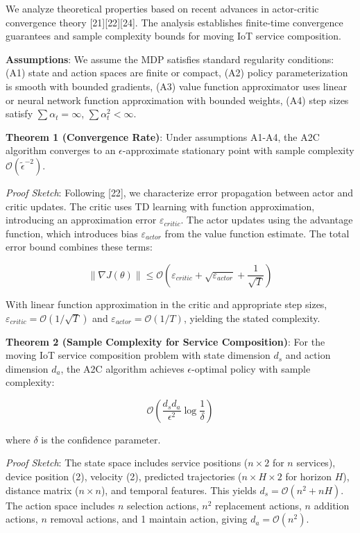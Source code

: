 \documentclass[
  10pt,
  twocolumn,
]{article}
\begin{document}
We analyze theoretical properties based on recent advances in
actor-critic convergence theory {[}21{]}{[}22{]}{[}24{]}. The analysis
establishes finite-time convergence guarantees and sample complexity
bounds for moving IoT service composition.

\textbf{Assumptions}: We assume the MDP satisfies standard regularity
conditions: (A1) state and action spaces are finite or compact, (A2)
policy parameterization is smooth with bounded gradients, (A3) value
function approximator uses linear or neural network function
approximation with bounded weights, (A4) step sizes satisfy
\(\sum \alpha_t = \infty\), \(\sum \alpha_t^2 < \infty\).

\textbf{Theorem 1 (Convergence Rate)}: Under assumptions A1-A4, the A2C
algorithm converges to an \(\epsilon\)-approximate stationary point with
sample complexity \(\mathcal{O}(\tilde{\epsilon}^{-2})\).

\emph{Proof Sketch}: Following {[}22{]}, we characterize error
propagation between actor and critic updates. The critic uses TD
learning with function approximation, introducing an approximation error
\(\varepsilon_{critic}\). The actor updates using the advantage
function, which introduces bias \(\varepsilon_{actor}\) from the value
function estimate. The total error bound combines these terms:

\[\| \nabla J(\theta) \| \leq \mathcal{O}(\varepsilon_{critic} + \sqrt{\varepsilon_{actor}} + \frac{1}{\sqrt{T}})\]

With linear function approximation in the critic and appropriate step
sizes, \(\varepsilon_{critic} = \mathcal{O}(1/\sqrt{T})\) and
\(\varepsilon_{actor} = \mathcal{O}(1/T)\), yielding the stated
complexity.

\textbf{Theorem 2 (Sample Complexity for Service Composition)}: For the
moving IoT service composition problem with state dimension \(d_s\) and
action dimension \(d_a\), the A2C algorithm achieves
\(\epsilon\)-optimal policy with sample complexity:

\[\mathcal{O}\left(\frac{d_s d_a}{\epsilon^2} \log\frac{1}{\delta}\right)\]

where \(\delta\) is the confidence parameter.

\emph{Proof Sketch}: The state space includes service positions
(\(n \times 2\) for \(n\) services), device position (2), velocity (2),
predicted trajectories (\(n \times H \times 2\) for horizon \(H\)),
distance matrix (\(n \times n\)), and temporal features. This yields
\(d_s = \mathcal{O}(n^2 + nH)\). The action space includes \(n\)
selection actions, \(n^2\) replacement actions, \(n\) addition actions,
\(n\) removal actions, and 1 maintain action, giving
\(d_a = \mathcal{O}(n^2)\).
\end{document}
